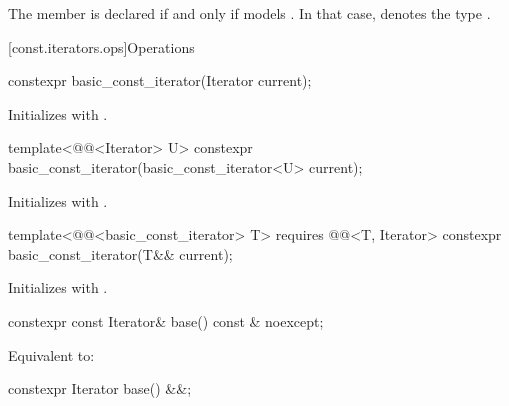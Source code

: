 \pnum
The member   is declared
if and only if  models .
In that case,
 denotes
the type .

[const.iterators.ops]{Operations}

%
\begin{itemdecl}
constexpr basic_const_iterator(Iterator current);
\end{itemdecl}

\begin{itemdescr}
\pnum
\effects
Initializes  with .
\end{itemdescr}

%
\begin{itemdecl}
template<@@<Iterator> U>
  constexpr basic_const_iterator(basic_const_iterator<U> current);
\end{itemdecl}

\begin{itemdescr}
\pnum
\effects
Initializes 
with .
\end{itemdescr}

%
\begin{itemdecl}
template<@@<basic_const_iterator> T>
  requires @@<T, Iterator>
  constexpr basic_const_iterator(T&& current);
\end{itemdecl}

\begin{itemdescr}
\pnum
\effects
Initializes  with .
\end{itemdescr}

%
\begin{itemdecl}
constexpr const Iterator& base() const & noexcept;
\end{itemdecl}

\begin{itemdescr}
\pnum
\effects
Equivalent to: 
\end{itemdescr}

%
\begin{itemdecl}
constexpr Iterator base() &&;
\end{itemdecl}

